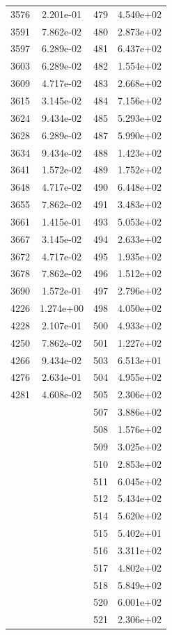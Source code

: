 \documentclass[12pt]{article}
\begin{document}
\begin{longtable}{@{}cccc@{}}
3576 & 2.201e-01 & 479 & 4.540e+02 \\
3591 & 7.862e-02 & 480 & 2.873e+02 \\
3597 & 6.289e-02 & 481 & 6.437e+02 \\
3603 & 6.289e-02 & 482 & 1.554e+02 \\
3609 & 4.717e-02 & 483 & 2.668e+02 \\
3615 & 3.145e-02 & 484 & 7.156e+02 \\
3624 & 9.434e-02 & 485 & 5.293e+02 \\
3628 & 6.289e-02 & 487 & 5.990e+02 \\
3634 & 9.434e-02 & 488 & 1.423e+02 \\
3641 & 1.572e-02 & 489 & 1.752e+02 \\
3648 & 4.717e-02 & 490 & 6.448e+02 \\
3655 & 7.862e-02 & 491 & 3.483e+02 \\
3661 & 1.415e-01 & 493 & 5.053e+02 \\
3667 & 3.145e-02 & 494 & 2.633e+02 \\
3672 & 4.717e-02 & 495 & 1.935e+02 \\
3678 & 7.862e-02 & 496 & 1.512e+02 \\
3690 & 1.572e-01 & 497 & 2.796e+02 \\
4226 & 1.274e+00 & 498 & 4.050e+02 \\
4228 & 2.107e-01 & 500 & 4.933e+02 \\
4250 & 7.862e-02 & 501 & 1.227e+02 \\
4266 & 9.434e-02 & 503 & 6.513e+01 \\
4276 & 2.634e-01 & 504 & 4.955e+02 \\
4281 & 4.608e-02 & 505 & 2.306e+02 \\
 &  & 507 & 3.886e+02 \\
 &  & 508 & 1.576e+02 \\
 &  & 509 & 3.025e+02 \\
 &  & 510 & 2.853e+02 \\
 &  & 511 & 6.045e+02 \\
 &  & 512 & 5.434e+02 \\
 &  & 514 & 5.620e+02 \\
 &  & 515 & 5.402e+01 \\
 &  & 516 & 3.311e+02 \\
 &  & 517 & 4.802e+02 \\
 &  & 518 & 5.849e+02 \\
 &  & 520 & 6.001e+02 \\
 &  & 521 & 2.306e+02 \\

\end{longtable}
\end{document}
